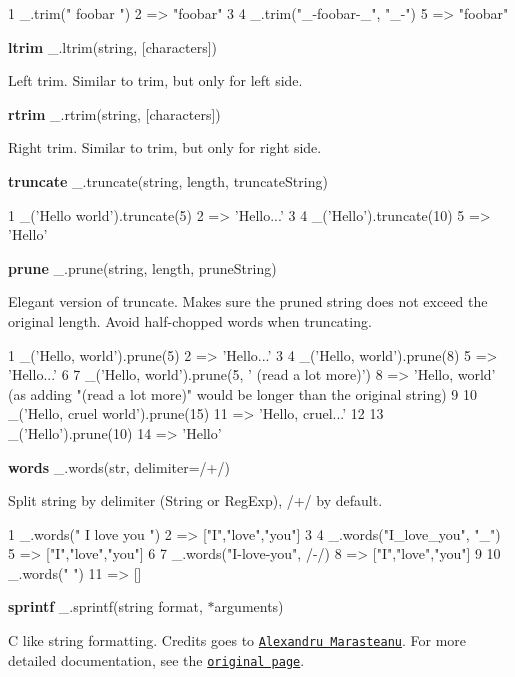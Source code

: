 \begin{DoxyCode}
1 \_.trim("  foobar   ")
2 => "foobar"
3 
4 \_.trim("\_-foobar-\_", "\_-")
5 => "foobar"
\end{DoxyCode}


{\bfseries ltrim} \+\_\+.\+ltrim(string, \mbox{[}characters\mbox{]})

Left trim. Similar to trim, but only for left side.

{\bfseries rtrim} \+\_\+.\+rtrim(string, \mbox{[}characters\mbox{]})

Right trim. Similar to trim, but only for right side.

{\bfseries truncate} \+\_\+.\+truncate(string, length, truncate\+String)


\begin{DoxyCode}
1 \_('Hello world').truncate(5)
2 => 'Hello...'
3 
4 \_('Hello').truncate(10)
5 => 'Hello'
\end{DoxyCode}


{\bfseries prune} \+\_\+.\+prune(string, length, prune\+String)

Elegant version of truncate. Makes sure the pruned string does not exceed the original length. Avoid half-\/chopped words when truncating.


\begin{DoxyCode}
1 \_('Hello, world').prune(5)
2 => 'Hello...'
3 
4 \_('Hello, world').prune(8)
5 => 'Hello...'
6 
7 \_('Hello, world').prune(5, ' (read a lot more)')
8 => 'Hello, world' (as adding "(read a lot more)" would be longer than the original string)
9 
10 \_('Hello, cruel world').prune(15)
11 => 'Hello, cruel...'
12 
13 \_('Hello').prune(10)
14 => 'Hello'
\end{DoxyCode}


{\bfseries words} \+\_\+.\+words(str, delimiter=/+/)

Split string by delimiter (String or Reg\+Exp), /+/ by default.


\begin{DoxyCode}
1 \_.words("   I   love   you   ")
2 => ["I","love","you"]
3 
4 \_.words("I\_love\_you", "\_")
5 => ["I","love","you"]
6 
7 \_.words("I-love-you", /-/)
8 => ["I","love","you"]
9 
10 \_.words("   ")
11 => []
\end{DoxyCode}


{\bfseries sprintf} \+\_\+.\+sprintf(string format, $\ast$arguments)

C like string formatting. Credits goes to \href{http://www.diveintojavascript.com/projects/javascript-sprintf}{\tt Alexandru Marasteanu}. For more detailed documentation, see the \href{http://www.diveintojavascript.com/projects/javascript-sprintf}{\tt original page}.


